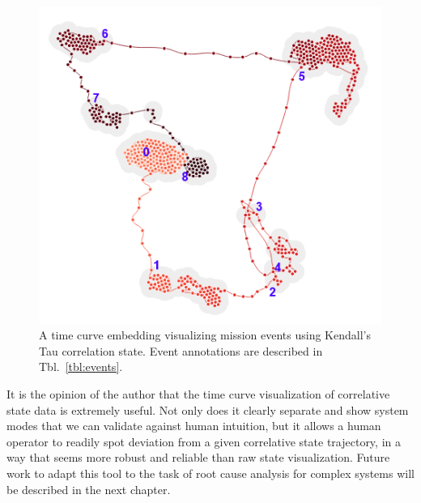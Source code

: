 \begin{figure}[h]
\centering
    \includegraphics{images/pfm2_tau_time_curve_annotated.png}
    \caption{A time curve embedding visualizing mission events using Kendall's Tau correlation state. Event annotations are described in Tbl.~\ref{tbl:events}.}
    \label{fig:pfm2_tau_time_curve_annotated}
\end{figure}

It is the opinion of the author that the time curve visualization of correlative state data is extremely useful. Not only does it clearly separate and show system modes that we can validate against human intuition, but it allows a human operator to readily spot deviation from a given correlative state trajectory, in a way that seems more robust and reliable than raw state visualization. Future work to adapt this tool to the task of root cause analysis for complex systems will be described in the next chapter.